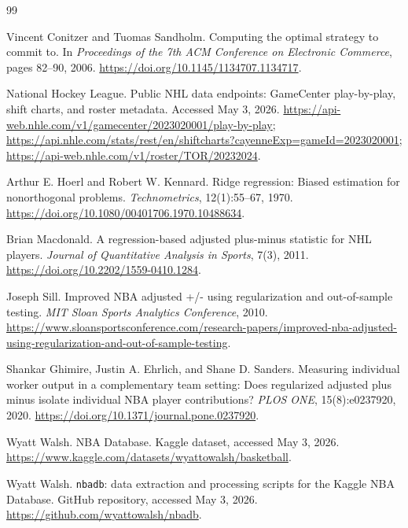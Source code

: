 \documentclass[11pt,letterpaper]{article}
\begin{document}
\begin{thebibliography}{99}

Vincent Conitzer and Tuomas Sandholm.
Computing the optimal strategy to commit to.
In \emph{Proceedings of the 7th ACM Conference on Electronic Commerce},
pages 82--90, 2006.
\url{https://doi.org/10.1145/1134707.1134717}.

National Hockey League.
Public NHL data endpoints: GameCenter play-by-play, shift charts, and roster
metadata. Accessed May 3, 2026.
\url{https://api-web.nhle.com/v1/gamecenter/2023020001/play-by-play};
\url{https://api.nhle.com/stats/rest/en/shiftcharts?cayenneExp=gameId=2023020001};
\url{https://api-web.nhle.com/v1/roster/TOR/20232024}.

Arthur E. Hoerl and Robert W. Kennard.
Ridge regression: Biased estimation for nonorthogonal problems.
\emph{Technometrics}, 12(1):55--67, 1970.
\url{https://doi.org/10.1080/00401706.1970.10488634}.

Brian Macdonald.
A regression-based adjusted plus-minus statistic for NHL players.
\emph{Journal of Quantitative Analysis in Sports}, 7(3), 2011.
\url{https://doi.org/10.2202/1559-0410.1284}.

Joseph Sill.
Improved NBA adjusted +/- using regularization and out-of-sample testing.
\emph{MIT Sloan Sports Analytics Conference}, 2010.
\url{https://www.sloansportsconference.com/research-papers/improved-nba-adjusted-using-regularization-and-out-of-sample-testing}.

Shankar Ghimire, Justin A. Ehrlich, and Shane D. Sanders.
Measuring individual worker output in a complementary team setting: Does
regularized adjusted plus minus isolate individual NBA player contributions?
\emph{PLOS ONE}, 15(8):e0237920, 2020.
\url{https://doi.org/10.1371/journal.pone.0237920}.

Wyatt Walsh.
NBA Database.
Kaggle dataset, accessed May 3, 2026.
\url{https://www.kaggle.com/datasets/wyattowalsh/basketball}.

Wyatt Walsh.
\texttt{nbadb}: data extraction and processing scripts for the Kaggle NBA
Database.
GitHub repository, accessed May 3, 2026.
\url{https://github.com/wyattowalsh/nbadb}.


\end{thebibliography}
\end{document}
